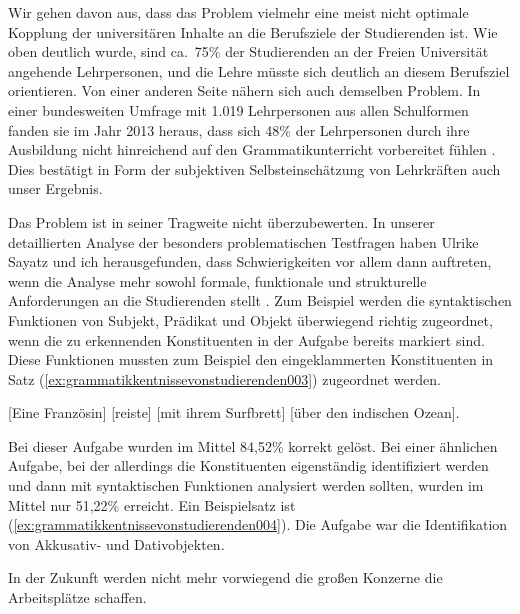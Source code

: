 Wir gehen davon aus, dass das Problem vielmehr eine meist nicht optimale Kopplung der universitären Inhalte an die Berufsziele der Studierenden ist.
Wie oben deutlich wurde, sind ca.\ 75\% der Studierenden an der Freien Universität angehende Lehrpersonen, und die Lehre müsste sich deutlich an diesem Berufsziel orientieren.
Von einer anderen Seite nähern sich auch \citet{TopalovicDuenschede2014} demselben Problem.
In einer bundesweiten Umfrage mit 1.019 Lehrpersonen aus allen Schulformen fanden sie im Jahr 2013 heraus, dass sich 48\% der Lehrpersonen durch ihre Ausbildung nicht hinreichend auf den Grammatikunterricht vorbereitet fühlen \citep[76--77]{TopalovicDuenschede2014}.
Dies bestätigt in Form der subjektiven Selbsteinschätzung von Lehrkräften auch unser Ergebnis.

Das Problem ist in seiner Tragweite nicht überzubewerten.
In unserer detaillierten Analyse der besonders problematischen Testfragen haben Ulrike Sayatz und ich herausgefunden, dass Schwierigkeiten vor allem dann auftreten, wenn die Analyse mehr sowohl formale, funktionale und strukturelle Anforderungen an die Studierenden stellt \citep[234--239]{SchaeferSayatz2017a}.
Zum Beispiel werden die syntaktischen Funktionen von Subjekt, Prädikat und Objekt überwiegend richtig zugeordnet, wenn die zu erkennenden Konstituenten in der Aufgabe bereits markiert sind.
Diese Funktionen mussten zum Beispiel den eingeklammerten Konstituenten in Satz (\ref{ex:grammatikkentnissevonstudierenden003}) zugeordnet werden.

\begin{exe}
  \ex\label{ex:grammatikkentnissevonstudierenden003} [Eine Französin] [reiste] [mit ihrem Surfbrett] [über den indischen Ozean].
\end{exe}

Bei dieser Aufgabe wurden im Mittel 84,52\% korrekt gelöst.
Bei einer ähnlichen Aufgabe, bei der allerdings die Konstituenten eigenständig identifiziert werden und dann mit syntaktischen Funktionen analysiert werden sollten, wurden im Mittel nur 51,22\% erreicht.
Ein Beispielsatz ist (\ref{ex:grammatikkentnissevonstudierenden004}).
Die Aufgabe war die Identifikation von Akkusativ- und Dativobjekten.

\begin{exe}
  \ex\label{ex:grammatikkentnissevonstudierenden004} In der Zukunft werden nicht mehr vorwiegend die großen Konzerne die Arbeitsplätze schaffen.
\end{exe}

